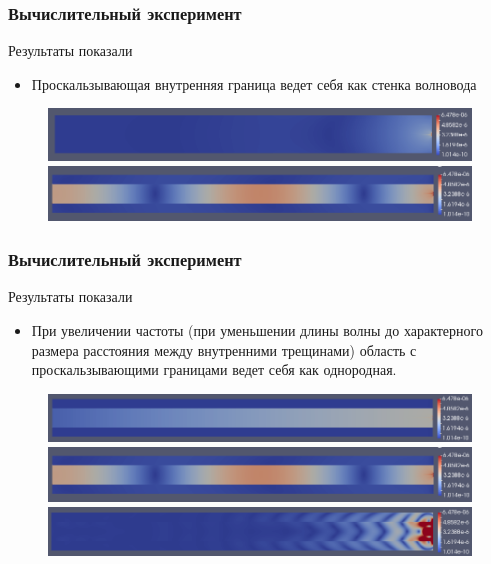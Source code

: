 \documentclass[unicode,aspectratio=43]{beamer}
\begin{document}
\begin{frame}\frametitle{Вычислительный эксперимент}

	Результаты показали 
	\begin{itemize}
		\item Проскальзывающая внутренняя граница ведет себя как стенка волновода
	\end{itemize}
	
	\begin{figure}[ht!]
		\centering
		\includegraphics[scale=0.346]{adhes}\\
		\medskip
		\includegraphics[scale=0.35]{sliding10}
	\end{figure}
	
\end{frame}

\begin{frame}\frametitle{Вычислительный эксперимент}
	Результаты показали 
	\begin{itemize}
		\item При увеличении частоты (при уменьшении длины волны до характерного размера расстояния между внутренними трещинами) область с проскальзывающими границами ведет себя как однородная. 
	\end{itemize}
	
	\begin{figure}[ht!]
		\centering
		\includegraphics[scale=0.346]{sliding1}\\
		\pause
		\medskip
		\includegraphics[scale=0.346]{sliding10}\\
		\pause
				\medskip
				\includegraphics[scale=0.346]{sliding100}\\
	\end{figure}
	
\end{frame}
\end{document}
